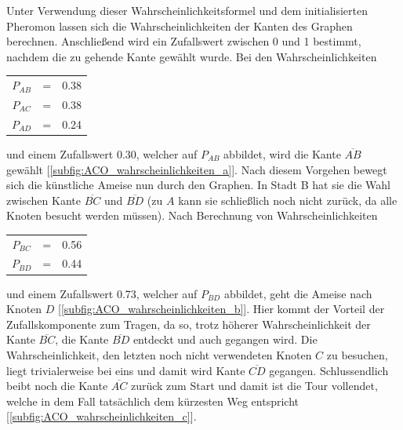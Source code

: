 \documentclass[pdftex,
               12pt,
               DIV=12,
               a4paper,
               twoside,
               parskip=half,
               abstract=true,
               dvipsnames]{scrartcl}
\begin{document}
Unter Verwendung dieser Wahrscheinlichkeitsformel und dem initialisierten Pheromon lassen sich die Wahrscheinlichkeiten der Kanten des Graphen berechnen. Anschlie\ss end wird ein Zufallswert zwischen 0 und 1 bestimmt, nachdem die zu gehende Kante gew\"ahlt wurde. Bei den Wahrscheinlichkeiten
\begin{center}
	\begin{tabular}{ c c c }
		$P_{AB}$ &=& 0.38 \\
		$P_{AC}$ &=& 0.38 \\
		$P_{AD}$ &=& 0.24
	\end{tabular}
\end{center}
und einem Zufallswert 0.30, welcher auf $P_{AB}$ abbildet, wird die Kante $\overline{AB}$ gew\"ahlt [\cref{subfig:ACO_wahrscheinlichkeiten_a}]. Nach diesem Vorgehen bewegt sich die k\"unstliche Ameise nun durch den Graphen. In Stadt B hat sie die Wahl zwischen Kante $\overline{BC}$ und $\overline{BD}$ (zu $A$ kann sie schlie\ss lich noch nicht zur\"uck, da alle Knoten besucht werden m\"ussen). Nach Berechnung von Wahrscheinlichkeiten
\begin{center}
	\begin{tabular}{ c c c }
		$P_{BC}$ &=& 0.56 \\
		$P_{BD}$ &=& 0.44
	\end{tabular}
\end{center}
und einem Zufallswert 0.73, welcher auf $P_{BD}$ abbildet, geht die Ameise nach Knoten $D$ [\cref{subfig:ACO_wahrscheinlichkeiten_b}]. Hier kommt der Vorteil der Zufallskomponente zum Tragen, da so, trotz h\"oherer Wahrscheinlichkeit der Kante $\overline{BC}$, die Kante $\overline{BD}$ entdeckt und auch gegangen wird. Die Wahrscheinlichkeit, den letzten noch nicht verwendeten Knoten $C$ zu besuchen, liegt trivialerweise bei eins und damit wird Kante $\overline{CD}$ gegangen. Schlussendlich beibt noch die Kante $\overline{AC}$ zur\"uck zum Start und damit ist die Tour vollendet, welche in dem Fall tats\"achlich dem k\"urzesten Weg entspricht [\cref{subfig:ACO_wahrscheinlichkeiten_c}]. \cite[vgl.][]{DorigoStuetzle04}
\end{document}
